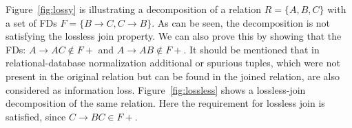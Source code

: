 Figure~\ref{fig:lossy} is illustrating a decomposition of a relation $R = \{A, B, C \}$ with
a set of FDs $F = \{B \rightarrow C, C \rightarrow B\}$. As can be seen, the decomposition is 
not satisfying the lossless join property. We can also prove this by showing that the FDs: 
$A \rightarrow AC \notin F+$ and $A \rightarrow AB \notin F+$.
It should be mentioned that in relational-database normalization additional or spurious tuples, which were
not present in the original relation but can be found in the joined relation, are also considered as information loss. 
Figure~\ref{fig:lossless} shows
a lossless-join decomposition of the same relation. Here the requirement for lossless join is satisfied,
since $C \rightarrow BC \in F+$.

\begin{figure}[h]
  \centering
  \subfigure[Lossless]{
}
\end{figure}
